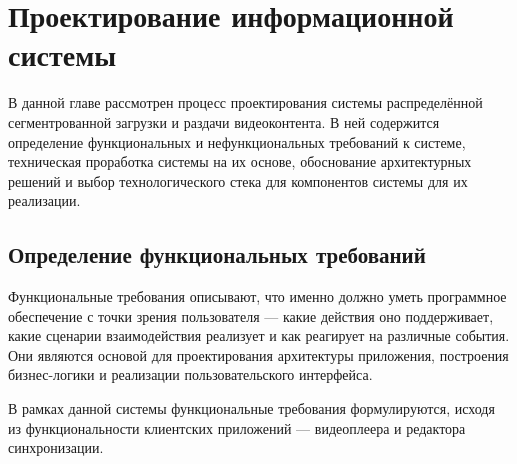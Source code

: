 \chapter{Проектирование информационной системы} \label{ch2}
	
В данной главе рассмотрен процесс проектирования системы распределённой сегментрованной загрузки и раздачи видеоконтента. В ней содержится определение функциональных и нефункциональных требований к системе, техническая проработка системы на их основе, обоснование архитектурных решений и выбор технологического стека для компонентов системы для их реализации.

\section{Определение функциональных требований} \label{ch2:func_requirements}

	Функциональные требования описывают, что именно должно уметь программное обеспечение с точки зрения пользователя — какие действия оно поддерживает, какие сценарии взаимодействия реализует и как реагирует на различные события. Они являются основой для проектирования архитектуры приложения, построения бизнес-логики и реализации пользовательского интерфейса.

	В рамках данной системы функциональные требования формулируются, исходя из функциональности клиентских приложений — видеоплеера и редактора синхронизации.

